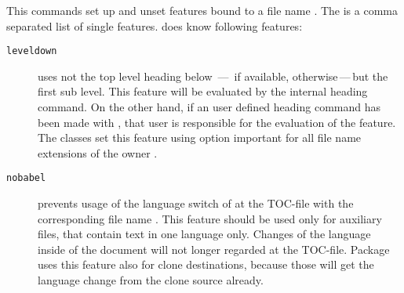 \begin{Declaration}
\end{Declaration}
This commands set up and unset features bound to a file name
. The  is a comma separated list of
single features.  does know following features:
\begin{description}
\item[\texttt{leveldown}] uses not the top level heading below
  \,---\, if available,
   otherwise\,---\,but the first sub level. This
  feature will be evaluated by the internal heading command. On the other
  hand, if an user defined heading command has been made with
  , that user is responsible for the evaluation of the
  feature. The \KOMAScript{} classes set this feature using option
  important{}%
   for all file name extensions of the
  owner .
\item[\texttt{nobabel}] prevents usage of the language switch of
   at the TOC-file with the corresponding
  file name . This feature should be used only for auxiliary
  files, that contain text in one language only. Changes of the language
  inside of the document will not longer regarded at the TOC-file. Package
   uses
  this feature also for clone destinations, because those will get the
  language change from the clone source already.


\end{description}
